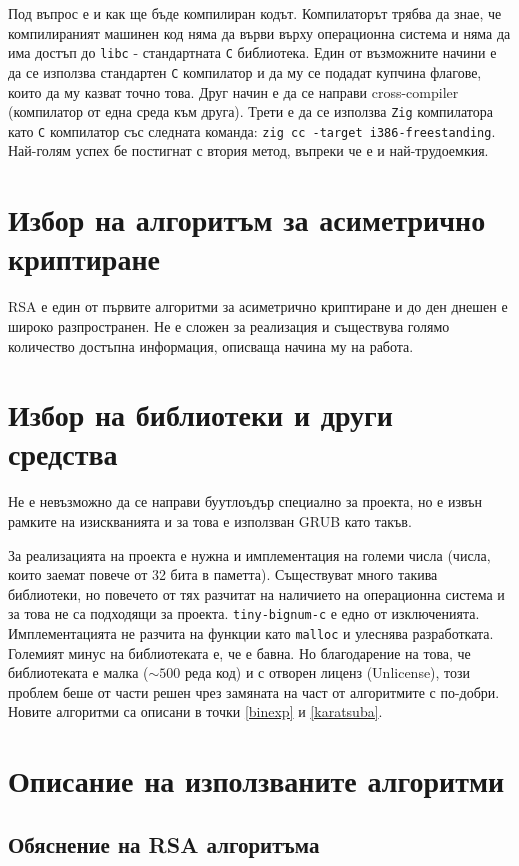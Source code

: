 Под въпрос е и как ще бъде компилиран кодът. Компилаторът трябва да знае, че компилираният машинен код няма да върви върху операционна система и няма да има достъп до {\tt libc} - стандартната {\tt C} библиотека. Един от възможните начини е да се използва стандартен {\tt C} компилатор и да му се подадат купчина флагове, които да му казват точно това. Друг начин е да се направи cross-compiler (компилатор от една среда към друга). Трети е да се използва {\tt Zig} компилатора като {\tt C} компилатор със следната команда:
{\tt zig cc -target i386-freestanding}.
Най-голям успех бе постигнат с втория метод, въпреки че е и най-трудоемкия.

\section{Избор на алгоритъм за асиметрично криптиране}
RSA е един от първите алгоритми за асиметрично криптиране и до ден днешен е широко разпространен. Не е сложен за реализация и съществува голямо количество достъпна информация, описваща начина му на работа.\cite{artoftheproblemrsa}\cite{rsapaper}

\section{Избор на библиотеки и други средства}
Не е невъзможно да се направи буутлоъдър специално за проекта, но е извън рамките на изискванията и за това е използван GRUB като такъв.

За реализацията на проекта е нужна и имплементация на големи числа (числа, които заемат повече от 32 бита в паметта). Съществуват много такива библиотеки, но повечето от тях разчитат на наличието на операционна система и за това не са подходящи за проекта. {\tt tiny-bignum-c}\cite{tinybignumc} е едно от изключенията. Имплементацията не разчита на функции като {\tt malloc} и улеснява разработката. Големият минус на библиотеката е, че е бавна. Но благодарение на това, че библиотеката е малка ($\sim 500$ реда код) и с отворен лиценз (Unlicense), този проблем беше от части решен чрез замяната на част от алгоритмите с по-добри. Новите алгоритми са описани в точки \ref{binexp} и \ref{karatsuba}.

\section{Описание на използваните алгоритми} \label{algos}
  \subsection{Обяснение на RSA алгоритъма}

